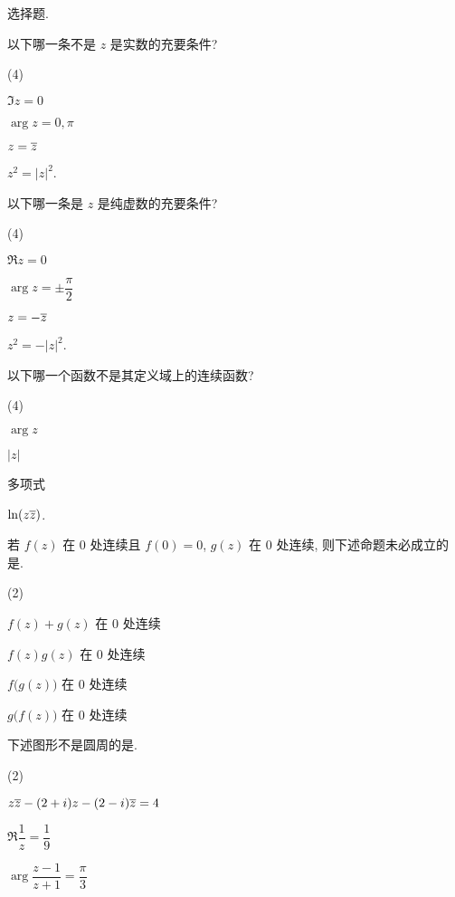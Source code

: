 \sectionHomework
\begin{homework}
  \item 选择题.
  \begin{exlist}
    \item 以下哪一条不是 $z$ 是实数的充要条件?\fillbrace{}
    \begin{taskschoice}(4)
      \item $\Im z=0$
      \item $\arg z=0,\pi$
      \item $z=\overline z$
      \item $z^2=|z|^2$.
    \end{taskschoice}
    \item 以下哪一条是 $z$ 是纯虚数的充要条件?\fillbrace{}
    \begin{taskschoice}(4)
      \item $\Re z=0$
      \item $\arg z=\pm\dfrac\pi2$
      \item $z=-\overline z$
      \item $z^2=-|z|^2$.
    \end{taskschoice}
    \item 以下哪一个函数不是其定义域上的连续函数?\fillbrace{}
    \begin{taskschoice}(4)
      \item $\arg z$
      \item $|z|$
      \item 多项式
      \item $\ln(z\overline z)$.
    \end{taskschoice}
    \item 若 $f(z)$ 在 $0$ 处连续且 $f(0)=0$, $g(z)$ 在 $0$ 处连续, 则下述命题未必成立的是\fillbrace{}.
    \begin{taskschoice}(2)
      \item $f(z)+g(z)$ 在 $0$ 处连续
      \item $f(z)g(z)$ 在 $0$ 处连续
      \item $f\bigl(g(z)\bigr)$ 在 $0$ 处连续
      \item $g\bigl(f(z)\bigr)$ 在 $0$ 处连续
    \end{taskschoice}
    \item 下述图形不是圆周的是\fillbrace{}.
    \begin{taskschoice}(2)
      \item $z\overline z-(2+i)z-(2-i)\overline z=4$
      \item $\Re\dfrac{1}{z}=\dfrac{1}{9}$
      \item $\arg\dfrac{z-1}{z+1}=\dfrac{\pi}{3}$

\end{taskschoice}
\end{exlist}
\end{homework}
